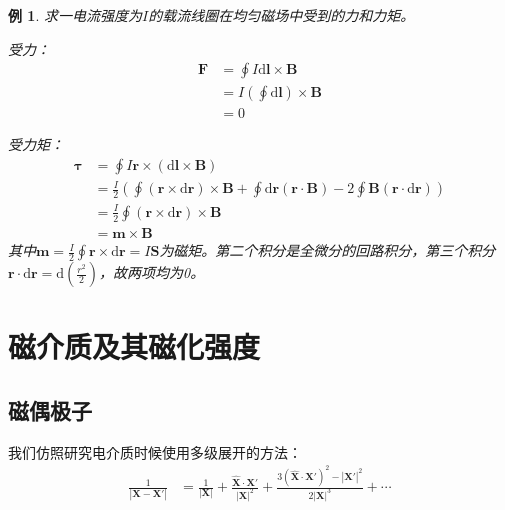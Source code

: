 \documentclass[12pt,onecolumn,a4paper]{book}
\newtheorem*{example}{例}
\numberwithin{table}{subsection}
\numberwithin{equation}{subsection}
\begin{document}
\begin{example}
    求一电流强度为$I$的载流线圈在均匀磁场中受到的力和力矩。

    受力：
    \begin{align}
        \mathbf{F} & = \oint I \mathrm{d} \mathbf{l} \times \mathbf{B}   \\
                   & = I (\oint \mathrm{d} \mathbf{l}) \times \mathbf{B} \\
                   & = 0
    \end{align}

    受力矩：
    \begin{align}
        \mathbf{\tau} & = \oint I\mathbf{r} \times (\mathrm{d} \mathbf{l} \times \mathbf{B})                                                                                                                                    \\
                      & = \frac{I}{2}(\oint (\mathbf{r} \times \mathrm{d} \mathbf{r})\times \mathbf{B} + \oint \mathrm{d} \mathbf{r} (\mathbf{r}\cdot \mathbf{B}) - 2\oint\mathbf{B} (\mathbf{r} \cdot \mathrm{d} \mathbf{r}) ) \\
                      & = \frac{I}{2}\oint (\mathbf{r} \times \mathrm{d} \mathbf{r})\times \mathbf{B}                                                                                                                           \\
                      & =  \mathbf{m} \times \mathbf{B}
    \end{align}
    其中$\mathbf{m} = \frac{I}{2}\oint \mathbf{r} \times \mathrm{d} \mathbf{r} = I \mathbf{S}$为磁矩。第二个积分是全微分的回路积分，第三个积分$\mathbf{r} \cdot \mathrm{d} \mathbf{r}= \mathrm{d}(\frac{r^2}{2})$，故两项均为0。

\end{example}

\section{磁介质及其磁化强度}

\subsection{磁偶极子}
我们仿照研究电介质时候使用多级展开的方法：
\begin{align}
    \frac{1}{|\mathbf{X}-\mathbf{X}'|} & = \frac{1}{|\mathbf{X}|} + \frac{\hat{\mathbf{X}} \cdot \mathbf{X}'}{|\mathbf{X}|^2} + \frac{3(\hat{\mathbf{X}} \cdot \mathbf{X}')^2 - |\mathbf{X}'|^2}{2|\mathbf{X}|^3} + \cdots
\end{align}
\end{document}
